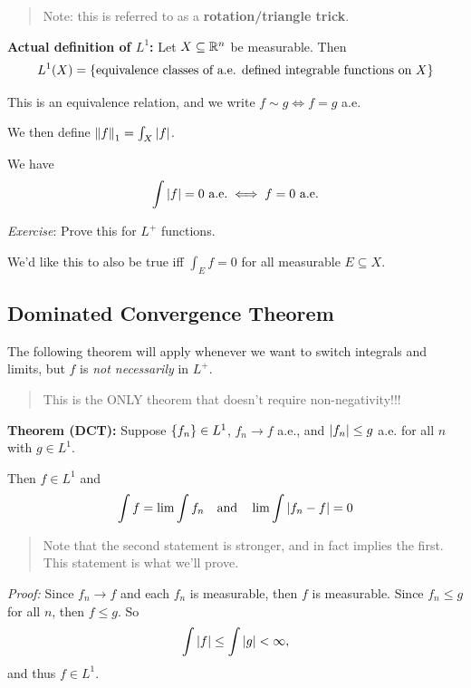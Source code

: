 \begin{quote}
Note: this is referred to as a \textbf{rotation/triangle trick}.
\end{quote}

\textbf{Actual definition of \(L^1\):} Let \(X \subseteq {\mathbb{R}}^n\) be
measurable. Then
\begin{align*}
L^1(X) = \left\{{\text{equivalence classes of a.e. defined integrable functions on $X$}}\right\}
\end{align*}

This is an equivalence relation, and we write \(f\sim g \iff f = g\)
a.e.

We then define \({\left\lVert {f} \right\rVert}_1 = \int_X {\left\lvert {f} \right\rvert}\).

We have
\begin{align*}
\int {\left\lvert {f} \right\rvert} = 0 ~\text{a.e.} \iff f = 0 ~\text{a.e.}
\end{align*}

\emph{Exercise}: Prove this for \(L^+\) functions.

We'd like this to also be true iff \(\int_E f = 0\) for all measurable
\(E \subseteq X\).

\hypertarget{dominated-convergence-theorem}{%
\subsection{Dominated Convergence
Theorem}\label{dominated-convergence-theorem}}

The following theorem will apply whenever we want to switch integrals
and limits, but \(f\) is \emph{not necessarily} in \(L^+\).

\begin{quote}
This is the ONLY theorem that doesn't require non-negativity!!!
\end{quote}

\textbf{Theorem (DCT):} Suppose \(\left\{{f_n}\right\} \in L^1\), \(f_n \to f\)
a.e., and \({\left\lvert {f_n} \right\rvert} \leq g\) a.e. for all \(n\) with \(g\in L^1\).

Then \(f\in L^1\) and
\begin{align*}
\int f = \lim \int f_n \quad\text{and}\quad \lim \int{\left\lvert {f_n - f} \right\rvert} = 0
\end{align*}

\begin{quote}
Note that the second statement is stronger, and in fact implies the
first. This statement is what we'll prove.
\end{quote}

\emph{Proof:} Since \(f_n \to f\) and each \(f_n\) is measurable, then
\(f\) is measurable. Since \(f_n \leq g\) for all \(n\), then
\(f \leq g\). So
\begin{align*}\int {\left\lvert {f} \right\rvert} \leq \int {\left\lvert {g} \right\rvert} < \infty
,\end{align*} and thus \(f\in L^1\).

